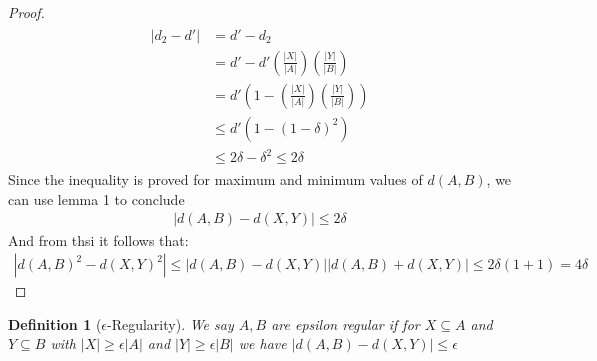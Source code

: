 \documentclass{tufte-handout}
\newtheorem{definition}{Definition}[]
\begin{document}
\begin{proof}
\begin{align}
\begin{split}
		|d_2-d'|&=d'-d_2\\
		&=d'-d'\left(\frac{|X|}{|A|}\right)\left(\frac{|Y|}{|B|}\right)\\
		&=d'\left(1-\left(\frac{|X|}{|A|}\right)\left(\frac{|Y|}{|B|}\right)\right)\\
		&\leq d'\left(1-(1-\delta)^2\right)\\
		&\leq 2\delta-\delta^2\leq 2\delta
	\end{split}
\end{align}
Since the inequality is proved for maximum and minimum values of $d(A,B)$, we can use lemma 1 to conclude 
\begin{align*}
	|d(A,B)-d(X,Y)|\leq 2\delta
\end{align*}
And from thsi it follows that:
\begin{align*}
	|d(A,B)^2-d(X,Y)^2|\leq |d(A,B)-d(X,Y)||d(A,B)+d(X,Y)|\leq 2\delta(1+1)=4\delta
\end{align*}
\end{proof}

\begin{definition}[$\epsilon$-Regularity]
	We say $A,B$ are epsilon regular if for $X\subseteq A$ and $Y\subseteq B$ with $|X|\geq\epsilon|A|$ and $|Y|\geq\epsilon|B|$ we have $|d(A,B)-d(X,Y)|\leq \epsilon$
\end{definition}













\end{document}
